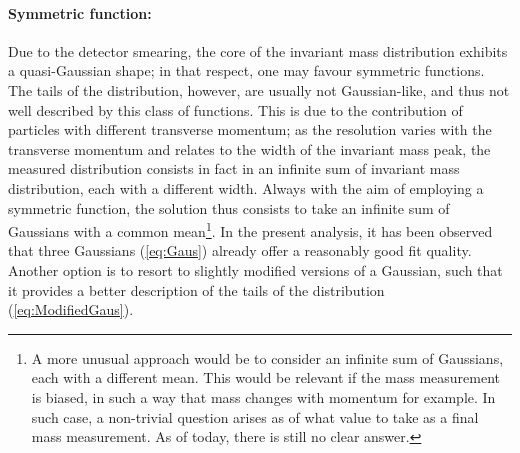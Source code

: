 \paragraph{Symmetric function:} Due to the detector smearing, the core of the invariant mass distribution exhibits a quasi-Gaussian shape; in that respect, one may favour symmetric functions. The tails of the distribution, however, are usually not Gaussian-like, and thus not well described by this class of functions. This is due to the contribution of particles with different transverse momentum; as the \pT resolution varies with the transverse momentum and relates to the width of the invariant mass peak, the measured distribution consists in fact in an infinite sum of invariant mass distribution, each with a different width. Always with the aim of employing a symmetric function, the solution thus consists to take an infinite sum of Gaussians with a common mean\footnote{A more unusual approach would be to consider an infinite sum of Gaussians, each with a different mean. This would be relevant if the mass measurement is biased, in such a way that mass changes with momentum for example. In such case, a non-trivial question arises as of what value to take as a final mass measurement. As of today, there is still no clear answer.}. In the present analysis, it has been observed that three Gaussians (\eq\ref{eq:Gaus}) already offer a reasonably good fit quality. Another option is to resort to slightly modified versions of a Gaussian, such that it provides a better description of the tails of the distribution (\eq\ref{eq:ModifiedGaus}).

